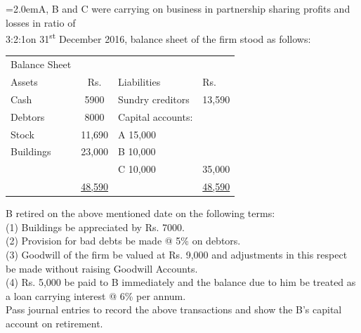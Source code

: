 \documentclass[11pt,a4paper]{article}
\newcommand{\lqn}[2]{\Needspace{6\baselineskip}\par\medskip\noindent\hangindent=2.0em\hangafter=1\makebox[2.0em][l]{\textbf{#1.}}#2\par}
\begin{document}
\lqn{101}{A, B and C were carrying on business in partnership sharing profits and losses in ratio of\\
3:2:1on 31\textsuperscript{st} December 2016, balance sheet of the firm stood as follows:\par
\par\smallskip\noindent\hspace*{1.2em}\begin{tabular}{|lcll|}
\hline
Balance Sheet &  &  &  \\
Assets & Rs. & Liabilities & Rs. \\
Cash & 5900 & Sundry creditors & 13,590 \\
Debtors & 8000 & Capital accounts: &  \\
Stock & 11,690 & A              15,000 &  \\
Buildings & 23,000 & B              10,000 &  \\
 &  & C              10,000 & 35,000 \\
 & \underline{48,590} &  & \underline{48,590} \\
\hline
\end{tabular}\par\smallskip
B retired on the above mentioned date on the following terms:\\
(1) Buildings be appreciated by Rs. 7000.\\
(2) Provision for bad debts be made @ 5\% on debtors.\\
(3) Goodwill of the firm be valued at Rs. 9,000 and adjustments in this respect be made without raising Goodwill Accounts.\\
(4) Rs. 5,000 be paid to B immediately and the balance due to him be treated as a loan carrying interest @ 6\% per annum.\\
Pass journal entries to record the above transactions and show the B’s capital account on retirement.\par
}
\end{document}
